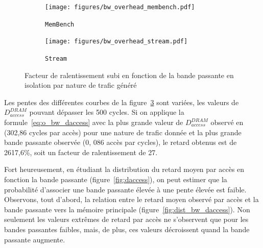 
\begin{figure}[h!]
	\centering
	\begin{subfigure}[t]{0.48\linewidth}
		\texttt{[image: figures/bw\_overhead\_membench.pdf]}
		\caption{\label{fig:bw_overhead_membench}\texttt{MemBench}}
	\end{subfigure}
	\begin{subfigure}[t]{0.48\linewidth}
		\texttt{[image: figures/bw\_overhead\_stream.pdf]}
		\caption{\label{fig:bw_overhead_stream}\texttt{Stream}}
	\end{subfigure}
	\caption{\label{fig:bw_overhead_detail}Facteur de ralentissement subi en fonction de la bande passante en isolation par nature de trafic généré}
\end{figure}

Les pentes des différentes courbes de la figure~\ref{fig:bw_overhead_detail} sont variées, les valeurs de $D_{access}^{DRAM}$ pouvant dépasser les 500 cycles.
Si on applique la formule~\ref{eq:o_bw_daccess} avec la plus grande valeur de $D_{access}^{DRAM}$ observé en  (302,86 cycles par accès) pour une nature de trafic donnée et la plus grande bande passante observée (0, 086 accès par cycles),
le retard obtenus est de 2617,6\%, soit un facteur de ralentissement de 27.

Fort heureusement, en étudiant la distribution du retard moyen par accès en fonction la bande passante (figure~\ref{fig:daccess}), on peut estimer que la probabilité d'associer une bande passante élevée à une pente élevée est faible.
Observons, tout d'abord, la relation entre le retard moyen observé par accès et la bande passante vers la mémoire principale (figure~\ref{fig:dist_bw_daccess}).
Non seulement les valeurs extrêmes de retard par accès ne s'observent que pour les bandes passantes faibles, mais, de plus,  ces valeurs décroissent quand la bande passante augmente.


